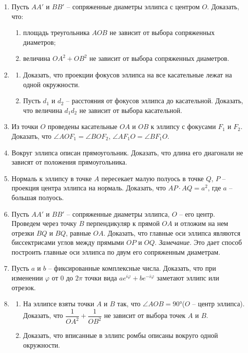 \begin{enumerate}
	\item Пусть $AA'$ и $BB'$ -- сопряженные диаметры эллипса с центром $O$. Доказать, что:
	\begin{enumerate}
		\item площадь треугольника $AOB$ не зависит от выбора сопряженных диаметров;
		\item величина $OA^2 + OB^2$ не зависит от выбора сопряженных диаметров.
	\end{enumerate}

	\item
	\begin{enumerate}
		\item Доказать, что проекции фокусов эллипса на все касательные лежат на одной окружности.
		\item Пусть $d_1$ и $d_2$ -- расстояния от фокусов эллипса до касательной. Доказать, что величина $d_1 d_2$ не зависит от выбора касательной.
	\end{enumerate}

	\item Из точки $O$ проведены касательные $OA$ и $OB$ к эллипсу с фокусами $F_1$ и $F_2$. Доказать, что $\angle AOF_1 = \angle BOF_2$, $\angle AF_1O = \angle BF_1O$.

	\item Вокруг эллипса описан прямоугольник. Доказать, что длина его диагонали не зависят от положения прямоугольника.

	\item Нормаль к эллипсу в точке $A$ пересекает малую полуось в точке $Q$, $P$ -- проекция центра эллипса на нормаль. Доказать, что $AP \cdot AQ = a^2$, где $a$ -- большая полуось.

	\item Пусть $AA'$ и $BB'$ -- сопряженные диаметры эллипса, $O$ -- его центр. Проведем через точку $B$ перпендикуляр к прямой $OA$ и отложим на нем отрезки $BQ$ и $BQ$, равные $OA$. Доказать, что главные оси эллипса являются биссектрисами углов между прямыми $OP$ и $OQ$.
	\textit{Замечание.} Это дает способ построить главные оси эллипса по двум его сопряженным диаметрам.

	\item Пусть $a$ и $b$ -- фиксированные комплексные числа. Доказать, что при изменении $\varphi$ от $0$ до $2\pi$ точки вида $ae^{i\varphi} + be^{-i\varphi}$ заметают эллипс или отрезок.

	\item
	\begin{enumerate}
		\item На эллипсе взяты точки $A$ и $B$ так, что $\angle AOB  = \ang{90}$($O$ -- центр эллипса). Доказать, что $\dfrac{1}{OA^2} + \dfrac{1}{OB^2}$ не зависит от выбора точек $A$ и $B$.
		\item Доказать, что вписанные в эллипс ромбы описаны вокруго одной окружности.
	\end{enumerate}


\end{enumerate}
